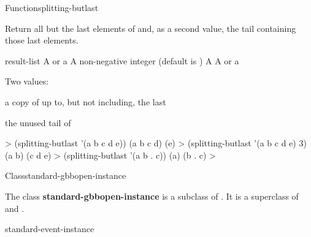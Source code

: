 \documentclass[10pt,twoside,english,pdftex]{article}
\begin{document}
\begin{functiondoc}{Function}{splitting-butlast}{
      
    \mbox{\returns{} }}
%
%
  
\fnsyntax

\fnpurpose Return all but the last  elements of 
and, as a second value, the tail containing those last 
elements. 

\fnpackage {}

\fnmodule {}

\fnargs
\begin{args}{result-list}
\arg[list] A  or a 
\arg[n] A non-negative integer (default is )
 A 
\arg[tail] A  or a 
\end{args}

\fnreturns Two values:
\begin{tightitemize}
\item a copy of  up to, but not including, the last
   
\item the unused tail of 
\end{tightitemize}

\fnexamples
%
\W\supp
\begin{example}
  > (splitting-butlast '(a b c d e))
  (a b c d)
  (e)
  > (splitting-butlast '(a b c d e) 3)
  (a b)
  (c d e)\goodpagebreak
  > (splitting-butlast '(a b . c))
  (a)
  (b . c)
  >
\end{example}

\end{functiondoc}


\begin{functiondoc}{Class}{standard-gbbopen-instance}{}
%
  
\fnsyntax

\fnpackage {}

\fnmodule {}

\fndescription The class \textbf{standard-gbbopen-instance} is a subclass of
.  It is a superclass of
\textbf{} and
\textbf{}.

\begin{alsos}{standard-event-instance}
\end{alsos}

\end{functiondoc}
\end{document}
